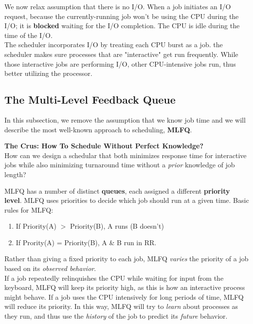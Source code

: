 We now relax assumption that there is no I/O. When a job initiates an I/O
request, because the currently-running job won't be using the CPU during the
I/O; it is \textbf{blocked} waiting for the I/O completion. The CPU is idle
during the time of the I/O.\\

The scheduler incorporates I/O by treating each CPU burst as a job. the
scheduler makes sure processes that are "interactive" get run frequently. While
those interactive jobs are performing I/O, other CPU-intensive jobs run, thus
better utilizing the processor.

\subsection{The Multi-Level Feedback Queue}

In this subsection, we remove the assumption that we know job time and 
we will describe the most well-known approach to
scheduling, \textbf{MLFQ}. \\

\begin{tcolorbox}
    \textbf{The Crus: How To Schedule Without Perfect Knowledge?}\\

    How can we design a schedular that both minimizes response time for
    interactive jobs while also minimizing turnaround time without a
    \textit{prior} knowledge of job length?\\
\end{tcolorbox}

MLFQ has a number of distinct \textbf{queues}, each assigned a different 
\textbf{priority level}. MLFQ uses priorities to decide which job should run
at a given time. Basic rules for MLFQ:

\begin{enumerate}
    \item If Priority(A) $>$ Priority(B), A runs (B doesn't)
    \item If Prority(A) = Priority(B), A \& B run in RR.
\end{enumerate}

Rather than giving a fixed priority to each job, MLFQ \textit{varies} the
priority of a job based on its \textit{observed behavior}.\\

If a job repeatedly relinquishes the CPU while
waiting for input from the keyboard, 
MLFQ will keep its priority high, as this is how an interactive process might
behave. If a job uses the CPU intensively for long periods of time, MLFQ will
reduce its priority. In this way, MLFQ will try to \textit{learn} about 
processes as they run, and thus use the \textit{history} of the job to
predict its \textit{future} behavior.

